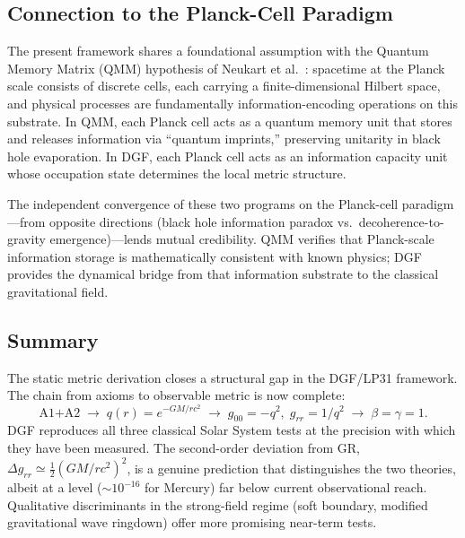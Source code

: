 \subsection{Connection to the Planck-Cell Paradigm}

The present framework shares a foundational assumption with the Quantum Memory Matrix (QMM) hypothesis of Neukart et al.~\cite{Neukart:2024}:
spacetime at the Planck scale consists of discrete cells, each carrying a finite-dimensional Hilbert space, and physical processes are fundamentally information-encoding operations on this substrate.
In QMM, each Planck cell acts as a quantum memory unit that stores and releases information via ``quantum imprints,'' preserving unitarity in black hole evaporation.
In DGF, each Planck cell acts as an information capacity unit whose occupation state determines the local metric structure.

The independent convergence of these two programs on the Planck-cell paradigm---from opposite directions (black hole information paradox vs.\ decoherence-to-gravity emergence)---lends mutual credibility.
QMM verifies that Planck-scale information storage is mathematically consistent with known physics; DGF provides the dynamical bridge from that information substrate to the classical gravitational field.

\subsection{Summary}

The static metric derivation closes a structural gap in the DGF/LP31 framework.
The chain from axioms to observable metric is now complete:
\begin{equation}
\text{A1+A2}\;\to\;q(r)=e^{-GM/rc^2}\;\to\;g_{00}=-q^2,\;g_{rr}=1/q^2\;\to\;\beta=\gamma=1.
\end{equation}
DGF reproduces all three classical Solar System tests at the precision with which they have been measured.
The second-order deviation from GR, $\Delta g_{rr}\simeq\frac{1}{2}(GM/rc^2)^2$, is a genuine prediction that distinguishes the two theories, albeit at a level (${\sim}10^{-16}$ for Mercury) far below current observational reach.
Qualitative discriminants in the strong-field regime (soft boundary, modified gravitational wave ringdown) offer more promising near-term tests.

